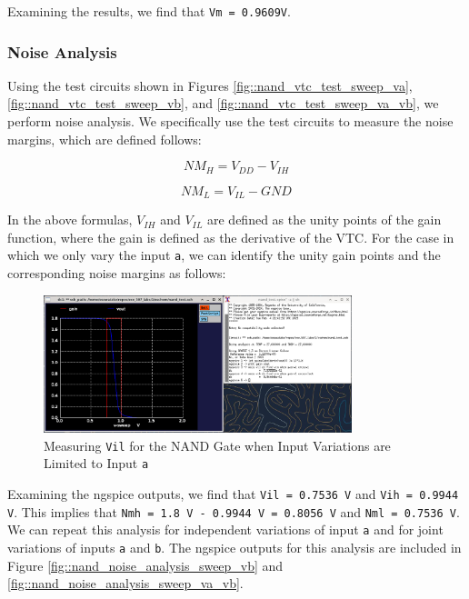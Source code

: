 \documentclass[fleqn]{article}
\begin{document}
	Examining the results, we find that \texttt{Vm = 0.9609V}.
	
	\subsubsection{Noise Analysis}
	\label{section::nand_noise_analysis}
	
	Using the test circuits shown in Figures \ref{fig::nand_vtc_test_sweep_va}, \ref{fig::nand_vtc_test_sweep_vb}, and \ref{fig::nand_vtc_test_sweep_va_vb}, we perform noise analysis. We specifically use the test circuits to measure the noise margins, which are defined follows:
	
	\begin{equation}
		NM_H = V_{DD} - V_{IH}
		\label{eq::noise_margin_high}
	\end{equation}
	
	\begin{equation}
		NM_L = V_{IL} - GND
		\label{eq::noise_margin_low}
	\end{equation}
	
	In the above formulas, $V_{IH}$ and $V_{IL}$ are defined as the unity points of the gain function, where the gain is defined as the derivative of the VTC. For the case in which we only vary the input \texttt{a}, we can identify the unity gain points and the corresponding noise margins as follows:
	
	\begin{figure}[H]
		\centerline{\includegraphics[width=0.8\textwidth]{nand_noise_analysis_sweep_va.png}}
		\caption{Measuring \texttt{Vil} for the NAND Gate when Input Variations are Limited to Input \texttt{a}}
		\label{fig::nand_noise_analysis_sweep_va}
	\end{figure}
	
	Examining the ngspice outputs, we find that \texttt{Vil = 0.7536 V} and \texttt{Vih = 0.9944 V}. This implies that \texttt{Nmh = 1.8 V - 0.9944 V = 0.8056 V} and \texttt{Nml = 0.7536 V}. We can repeat this analysis for independent variations of input \texttt{a} and for joint variations of inputs \texttt{a} and \texttt{b}. The ngspice outputs for this analysis are included in Figure \ref{fig::nand_noise_analysis_sweep_vb} and \ref{fig::nand_noise_analysis_sweep_va_vb}.
	
\end{document}
